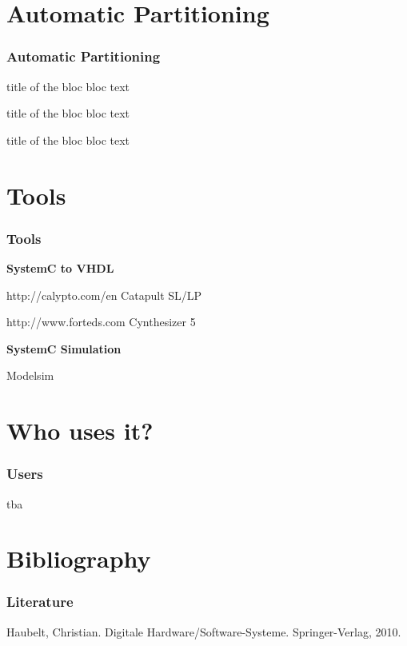 \documentclass{beamer}
\begin{document}
\section{Automatic Partitioning}
\begin{frame}\frametitle{Automatic Partitioning} 

\begin{block}{title of the bloc}
bloc text
\end{block}

\begin{exampleblock}{title of the bloc}
bloc text
\end{exampleblock}


\begin{alertblock}{title of the bloc}
bloc text
\end{alertblock}
\end{frame}

\section{Tools}
\begin{frame}\frametitle{Tools} 
\textbf{SystemC to VHDL}

http://calypto.com/en 	Catapult SL/LP

http://www.forteds.com	Cynthesizer 5 

\textbf{SystemC Simulation}

Modelsim
\end{frame}

\section{Who uses it?}
\begin{frame}\frametitle{Users} 
tba
\end{frame}
      
\section{Bibliography}
\begin{frame}\frametitle{Literature} 
Haubelt, Christian. Digitale Hardware/Software-Systeme. Springer-Verlag, 2010.

\end{frame}
\end{document}
